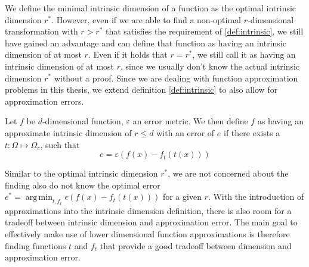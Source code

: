 \documentclass[
  a4paper,  %
  twoside,  %
  bibliography=totoc,
  headsepline,
  cleardoublepage=empty,
  parskip=half,
  draft=false
]{scrbook}
\DeclareMathOperator*{\argmin}{arg\,min}
\begin{document}
We define the minimal intrinsic dimension of a function as the optimal intrinsic dimension $r^\ast$.
However, even if we are able to find a non-optimal $r$-dimensional transformation with $r > r^\ast$ that satisfies the requirement of \cref{def:intrinsic}, we still have gained an advantage and can define that function as having an intrinsic dimension of at most $r$.
Even if it holds that $r=r^\ast$, we still call it as having an intrinsic dimension of at most $r$, since we usually don't know the actual intrinsic dimension $r^\ast$ without a proof.
Since we are dealing with function approximation problems in this thesis, we extend definition \cref{def:intrinsic} to also allow for approximation errors.

\begin{definition}
Let $f$ be $d$-dimensional function, $\varepsilon$ an error metric.
We then define $f$ as having an approximate intrinsic dimension of $r \leq d$ with an error of $e$ if there exists a $t \colon \Omega \mapsto \Omega_r$, such that
\begin{equation}
e=\varepsilon\left(f(x) - f_t(t(x))\right)
\end{equation}
\end{definition}

Similar to the optimal intrinsic dimension $r^\ast$, we are not concerned about the finding also do not know the optimal error $e^\ast= \argmin_{t, f_t} \epsilon(f(x) - f_t(t(x)))$ for a given $r$.
With the introduction of approximations into the intrinsic dimension definition, there is also room for a tradeoff between  intrinsic dimension and approximation error.
The main goal to effectively make use of lower dimensional function approximations is therefore finding functions $t$ and $f_t$ that provide a good tradeoff between dimension and approximation error.
\end{document}
